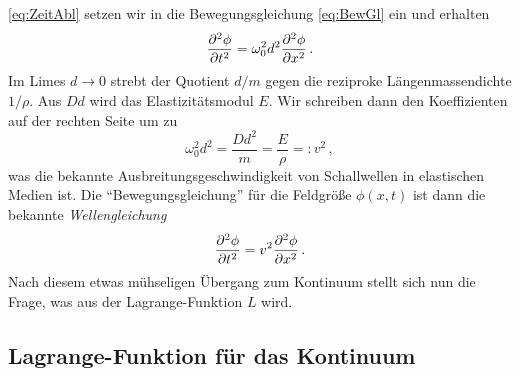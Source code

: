 \documentclass[paper=a4, fontsize=11.0pt, abstractoff, DIV12]{scrartcl}
\begin{document}
\eqref{eq:ZeitAbl} setzen wir in die Bewegungsgleichung \eqref{eq:BewGl} ein
und erhalten
\begin{equation}
\frac{\partial^2 \phi}{\partial {t}^2} = \omega_0^2d^2\frac{\partial^2 \phi}{\partial {x}^2}\,.
\end{equation}
Im Limes $d \to 0$ strebt der Quotient $d/m$ gegen die reziproke
Längenmassendichte $1/\rho$. Aus $Dd$ wird das Elastizitätsmodul $E$. Wir
schreiben dann den Koeffizienten auf der rechten Seite um zu
\begin{equation}
\omega_0^2d^2 = \frac{Dd^2}{m} = \frac{E}{\rho} =: v^2\,,
\end{equation}
was die bekannte Ausbreitungsgeschwindigkeit von Schallwellen in elastischen
Medien ist. Die ``Bewegungsgleichung'' für die Feldgröße $\phi(x,t)$ ist dann
die bekannte \emph{Wellengleichung}
\begin{equation}
\frac{\partial^2 \phi}{\partial {t}^2} = v^2\frac{\partial^2 \phi}{\partial {x}^2}\,.
\label{eq:Wellengleichung}
\end{equation}
Nach diesem etwas mühseligen Übergang zum Kontinuum stellt sich nun die Frage,
was aus der Lagrange-Funktion $L$ wird.

\subsection{Lagrange-Funktion für das Kontinuum}
\end{document}
